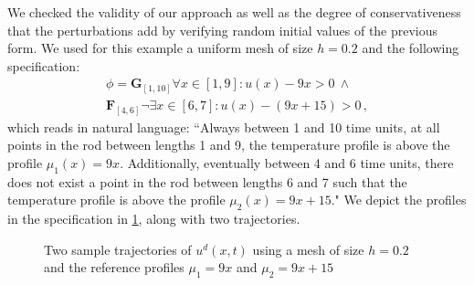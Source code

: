 \documentclass[letterpaper, 10 pt, conference]{ieeeconf/ieeeconf}
\newcommand{\Always}{\mathbf{G}}
\newcommand{\Event}{\mathbf{F}}
\begin{document}
We checked the validity of our approach as well as the degree of
conservativeness that the perturbations add by verifying random initial values
of the previous form. We used for this example a uniform mesh of size $h = 0.2$
and the following specification: 
%
\begin{multline}
        \phi = \Always_{[1, 10]} \forall x \in [1, 9]: u(x) - 9x > 0 \ \land \\
        \Event_{[4, 6]} \lnot \exists x \in [6, 7]: u(x) - (9x + 15) > 0 \,,
\end{multline}
%
which reads in natural language: ``Always between 1 and 10 time units, at all
points in the rod between lengths 1 and 9, the temperature profile is above the
profile $\mu_1(x) = 9x$. Additionally, eventually between 4 and 6 time units,
there does not exist a point in the rod between lengths 6 and 7 such that the
temperature profile is above the profile $\mu_2(x) = 9x + 15$." We depict the
profiles in the specification in \cref{fig:ex2_evolution}, along with two
trajectories.

\begin{figure}[!t]
    \centering 
        \hfill
        \hfill
        \caption{Two sample trajectories of $u^d(x, t)$ using a mesh of size
        $h=0.2$ and the reference profiles $\mu_1 = 9x$ and $\mu_2 = 9x + 15$}
    \label{fig:ex2_evolution}
\end{figure}
\end{document}
